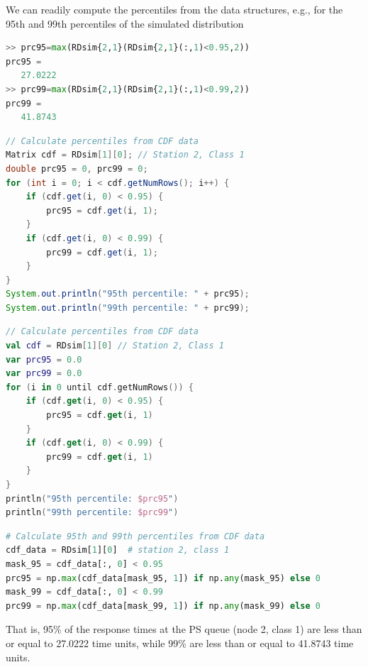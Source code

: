 We can readily compute the percentiles from the  data structures, e.g., for the 95th and 99th percentiles of the simulated distribution
\begin{MATLAB}
\begin{lstlisting}[language = python]
>> prc95=max(RDsim{2,1}(RDsim{2,1}(:,1)<0.95,2))
prc95 =
   27.0222
>> prc99=max(RDsim{2,1}(RDsim{2,1}(:,1)<0.99,2))
prc99 =
   41.8743
\end{lstlisting}
\end{MATLAB}
\begin{JAVA}
\begin{lstlisting}[language=java, basicstyle=\ttfamily\scriptsize]
// Calculate percentiles from CDF data
Matrix cdf = RDsim[1][0]; // Station 2, Class 1
double prc95 = 0, prc99 = 0;
for (int i = 0; i < cdf.getNumRows(); i++) {
    if (cdf.get(i, 0) < 0.95) {
        prc95 = cdf.get(i, 1);
    }
    if (cdf.get(i, 0) < 0.99) {
        prc99 = cdf.get(i, 1);
    }
}
System.out.println("95th percentile: " + prc95);
System.out.println("99th percentile: " + prc99);
\end{lstlisting}
\end{JAVA}
\begin{KOTLIN}
\begin{lstlisting}[language=kotlin, basicstyle=\ttfamily\scriptsize]
// Calculate percentiles from CDF data
val cdf = RDsim[1][0] // Station 2, Class 1
var prc95 = 0.0
var prc99 = 0.0
for (i in 0 until cdf.getNumRows()) {
    if (cdf.get(i, 0) < 0.95) {
        prc95 = cdf.get(i, 1)
    }
    if (cdf.get(i, 0) < 0.99) {
        prc99 = cdf.get(i, 1)
    }
}
println("95th percentile: $prc95")
println("99th percentile: $prc99")
\end{lstlisting}
\end{KOTLIN}
\begin{PYTHON}
\begin{lstlisting}[language = python]
# Calculate 95th and 99th percentiles from CDF data
cdf_data = RDsim[1][0]  # station 2, class 1
mask_95 = cdf_data[:, 0] < 0.95
prc95 = np.max(cdf_data[mask_95, 1]) if np.any(mask_95) else 0
mask_99 = cdf_data[:, 0] < 0.99
prc99 = np.max(cdf_data[mask_99, 1]) if np.any(mask_99) else 0
\end{lstlisting}
\end{PYTHON}
That is, 95\% of the response times at the PS queue (node 2, class 1) are less than or equal to 27.0222 time units, while 99\% are less than or equal to 41.8743 time units.

